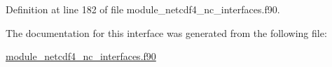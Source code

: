 Definition at line 182 of file module\+\_\+netcdf4\+\_\+nc\+\_\+interfaces.\+f90.



The documentation for this interface was generated from the following file\+:\begin{DoxyCompactItemize}
\item 
\hyperlink{module__netcdf4__nc__interfaces_8f90}{module\+\_\+netcdf4\+\_\+nc\+\_\+interfaces.\+f90}\end{DoxyCompactItemize}
